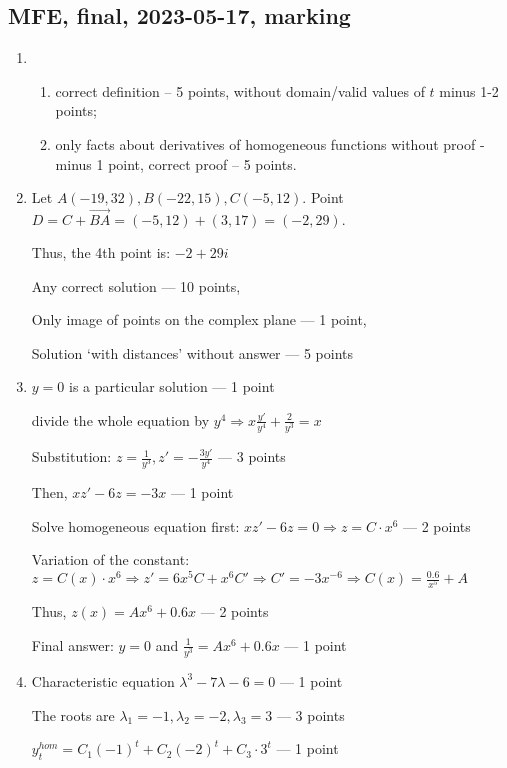 \subsection{MFE, final, 2023-05-17, marking}
\begin{enumerate}

    \item 
    \begin{enumerate}
      \item  correct definition – 5 points, without domain/valid values of  $t$  minus 1-2 points;
      \item only facts about derivatives of homogeneous functions without proof -  minus 1 point, correct proof – 5 points.
    \end{enumerate}

    \item Let $A(-19,32), B(-22,15), C(-5,12)$. Point $D=C+\overrightarrow{BA}=(-5,12)+(3,17)=(-2,29).$
    
    Thus, the 4th point is: $-2+29i$


Any correct solution — 10 points,

Only image of points on the complex plane — 1 point,

Solution `with distances' without answer — 5 points

    \item $y=0$ is a particular solution — 1 point
    
    divide the whole equation by $y^4\Rightarrow x\frac{y'}{y^4}+\frac{2}{y^3}=x$

    Substitution: $z=\frac{1}{y^3},z'=-\frac{3y'}{y^4}$  — 3 points

    Then, $xz'-6z=-3x$ — 1 point

    Solve homogeneous equation first: $xz'-6z=0\Rightarrow z=C\cdot x^6$ — 2 points

    Variation of the constant: $z=C(x)\cdot x^6\Rightarrow z'=6x^5C+x^6C'\Rightarrow C'=-3x^{-6}\Rightarrow C(x)=\frac{0.6}{x^5}+A$

    Thus, $z(x)=Ax^6+0.6x$ — 2 points

    Final answer: $y=0$ and $\frac{1}{y^3}=Ax^6+0.6x$ — 1 point

    \item Characteristic equation $\lambda^3-7\lambda-6=0$ — 1 point

    The roots are $\lambda_1=-1, \lambda_2=-2, \lambda_3=3$ — 3 points

    $y_t^{hom}=C_1(-1)^t+C_2(-2)^t+C_3\cdot 3^t$ — 1 point


\end{enumerate}
